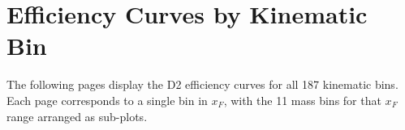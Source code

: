 \documentclass[11pt]{article}
\begin{document}
%
%
%
%
%
%
%
\section{Efficiency Curves by Kinematic Bin}
\label{sec:plots}
The following pages display the D2 efficiency curves for all 187 kinematic bins. Each page corresponds to a single bin in $x_F$, with the 11 mass bins for that $x_F$ range arranged as sub-plots.
\end{document}
